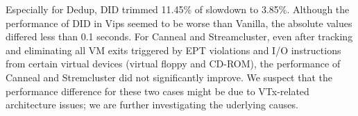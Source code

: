 Especially for Dedup, DID trimmed 11.45\% of slowdown to
3.85\%. Although the performance of DID in Vips seemed to be
worse than Vanilla, the absolute values
differed less than 0.1 seconds.
For Canneal and Streamcluster,
even after tracking and eliminating all VM exits triggered by EPT violations
and I/O instructions from certain virtual devices
(virtual floppy and CD-ROM), the performance of 
Canneal and Stremcluster did not significantly improve.
We suspect that the performance difference for these two cases 
might be due to VTx-related architecture issues; we are
further investigating the uderlying causes.

